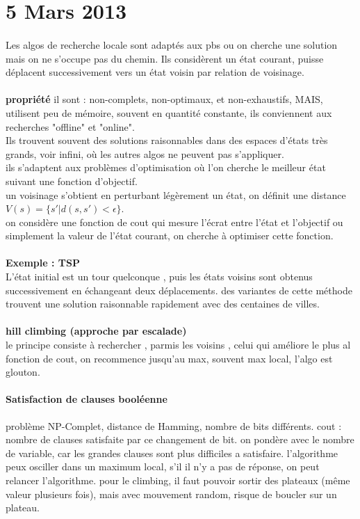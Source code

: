 \documentclass{article}
\begin{document}
\section{5 Mars 2013}
\paragraph{} Les algos de recherche locale sont adaptés aux pbs ou on cherche une solution mais on ne s'occupe pas du chemin. Ils considèrent un état courant, puisse déplacent successivement vers un état voisin par relation de voisinage. \\\\\textbf{propriété} il sont : non-complets, non-optimaux, et non-exhaustifs, MAIS, utilisent peu de mémoire, souvent en quantité constante, ils conviennent aux recherches "offline" et "online".\\ Ils trouvent souvent des solutions raisonnables dans des espaces d'états très grands, voir infini, où les autres algos ne peuvent pas s'appliquer.\\ils s'adaptent aux problèmes d'optimisation où l'on cherche le meilleur état suivant une fonction d'objectif.\\ un voisinage s'obtient en perturbant légèrement un état, on définit une distance $V(s) = \{s' |d(s,s') < \epsilon\}$.\\on considère une fonction de cout qui mesure l'écrat entre l'état et l'objectif ou simplement la valeur de l'état courant, on cherche à optimiser cette fonction.\\\\\textbf{Exemple : TSP}\\ L'état initial est un tour quelconque , puis les états voisins sont obtenus successivement en échangeant deux déplacements. des variantes de cette méthode trouvent une solution raisonnable rapidement avec des centaines de villes.\\\\\textbf{hill climbing (approche par escalade)}\\ le principe consiste à rechercher , parmis les voisins , celui qui améliore le plus al fonction de cout, on recommence jusqu'au max, souvent max local, l'algo est glouton.

\paragraph{Satisfaction de clauses booléenne} problème NP-Complet, distance de Hamming, nombre de bits différents. cout : nombre de clauses satisfaite par ce changement de bit. on pondère avec le nombre de variable, car les grandes clauses sont plus difficiles a satisfaire. l'algorithme peux osciller dans un maximum local, s'il il n'y a pas de réponse, on peut relancer l'algorithme. pour le climbing, il faut pouvoir sortir des plateaux (même valeur plusieurs fois), mais avec mouvement random, risque de boucler sur un plateau.
\end{document}
